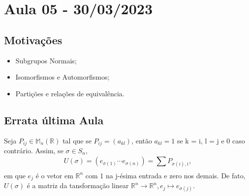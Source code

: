 \documentclass[Algebra/algebra_notes.tex]{subfiles}
\begin{document}
\section{Aula 05 - 30/03/2023}
\subsection{Motivações}
\begin{itemize}
	\item Subgrupos Normais;
	\item Isomorfismos e Automorfismos;
	\item Partições e relações de equivalência.
\end{itemize}
\subsection*{Errata última Aula}
Seja $P_{ij}\in \mathbb{M}_{n}(\mathbb{R})$ tal que se $P_{ij}=(a_{kl})$, então $a_{kl} = 1$ se k = i, l = j e 0 caso contrário.
Assim, se $\sigma\in S_{n},$
$$
	U(\sigma) = (e_{\sigma(1)}\cdots e_{\sigma(n)}) = \sum\limits_{}^{}P_{\sigma(i), i},
$$
em que $e_{j}$ é o vetor em $\mathbb{R}^{n}$ com 1 na j-ésima entrada e zero nos demais. De fato, $U(\sigma)$ é a matriz
da tansformação linear $\mathbb{R}^{n}\rightarrow \mathbb{R}^{n}, e_{j}\mapsto e_{\sigma(j)}.$
\end{document}
